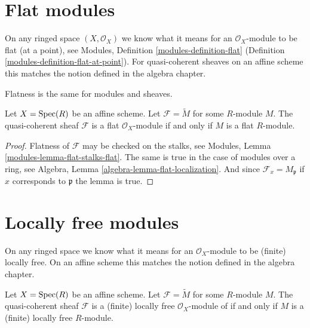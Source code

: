 \section{Flat modules}
\label{section-flat}

\noindent
On any ringed space $(X, \mathcal{O}_X)$
we know what it means for an $\mathcal{O}_X$-module
to be flat (at a point), see
Modules, Definition \ref{modules-definition-flat}
(Definition \ref{modules-definition-flat-at-point}).
For quasi-coherent sheaves on an affine scheme this matches the notion
defined in the algebra chapter.

\begin{lemma}
\label{lemma-flat-module}
\begin{slogan}
Flatness is the same for modules and sheaves.
\end{slogan}
Let $X = \mathop{\mathrm{Spec}}(R)$ be an affine scheme.
Let $\mathcal{F} = \widetilde{M}$ for some $R$-module $M$.
The quasi-coherent sheaf $\mathcal{F}$ is a flat
$\mathcal{O}_X$-module if and only if $M$ is a flat $R$-module.
\end{lemma}

\begin{proof}
Flatness of $\mathcal{F}$ may be checked on the stalks, see
Modules, Lemma \ref{modules-lemma-flat-stalks-flat}.
The same is true in the case of modules over a ring, see
Algebra, Lemma \ref{algebra-lemma-flat-localization}.
And since $\mathcal{F}_x = M_{\mathfrak p}$ if $x$ corresponds
to $\mathfrak p$ the lemma is true.
\end{proof}





\section{Locally free modules}
\label{section-finite-locally-free}

\noindent
On any ringed space we know what it means for an $\mathcal{O}_X$-module
to be (finite) locally free. On an affine scheme this matches the notion
defined in the algebra chapter.

\begin{lemma}
\label{lemma-locally-free-module}
Let $X = \mathop{\mathrm{Spec}}(R)$ be an affine scheme.
Let $\mathcal{F} = \widetilde{M}$ for some $R$-module $M$.
The quasi-coherent sheaf $\mathcal{F}$ is a (finite) locally free
$\mathcal{O}_X$-module of if and only if $M$ is a (finite)
locally free $R$-module.
\end{lemma}


